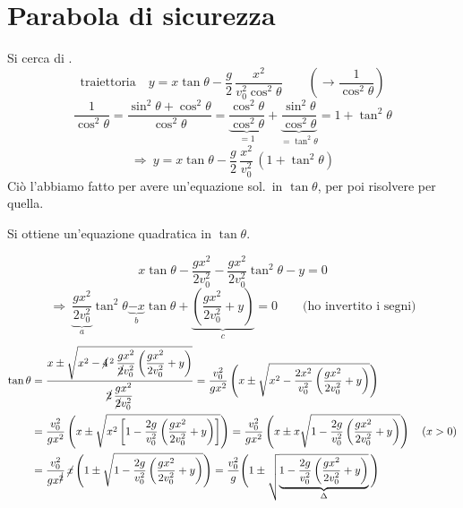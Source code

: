 \documentclass[11pt,a4paper,openany]{report}
\begin{document}
\section{Parabola di sicurezza}

Si cerca di .
\[
  \text{traiettoria}\quad y = x\tan\theta - \frac{g}{2}\,\frac{x^2}{v_0^2\cos^2\theta}
  \qquad \left(\to \frac{1}{\cos^2\theta}\right)
\]
\[
  \frac{1}{\cos^2\theta} = \frac{\sin^2\theta + \cos^2\theta}{\cos^2\theta}
  = \underbrace{\frac{\cos^2\theta}{\cos^2\theta}}_{= 1} + \underbrace{\frac{\sin^2\theta}{\cos^2\theta}}_{= \tan^2\theta}
  = 1 + \tan^2\theta
\]
\[
  \Rightarrow\ y = x\tan\theta - \frac{g}{2}\,\frac{x^2}{v_0^2}\,(1 + \tan^2\theta)
\]
Ciò l'abbiamo fatto per avere un'equazione sol.\ in $\tan\theta$, per poi risolvere per quella.

\begin{delucidazione}
Si ottiene un'equazione quadratica in $\tan\theta$.
\end{delucidazione}

\[
  x\tan\theta - \frac{gx^2}{2v_0^2} - \frac{gx^2}{2v_0^2}\tan^2\theta - y = 0
\]
\[
  \Rightarrow\ \underbrace{\frac{gx^2}{2v_0^2}}_{a}\tan^2\theta \underbrace{- x}_{b}\tan\theta
  + \underbrace{\left(\frac{gx^2}{2v_0^2} + y\right)}_{c} = 0
  \qquad \text{(ho invertito i segni)}
\]
\begin{align*}
  \tan\theta
  &= \frac{x \pm \sqrt{x^2 - \cancel{4}^{\,2}\,\dfrac{gx^2}{\cancel{2}v_0^2}\left(\dfrac{gx^2}{2v_0^2} + y\right)}}{\cancel{2}\,\dfrac{gx^2}{\cancel{2}v_0^2}}
   = \frac{v_0^2}{gx^2}\left(x \pm \sqrt{x^2 - \frac{2x^2}{v_0^2}\left(\frac{gx^2}{2v_0^2} + y\right)}\right) \\
  &= \frac{v_0^2}{gx^2}\left(x \pm \sqrt{x^2\left[1 - \frac{2g}{v_0^2}\left(\frac{gx^2}{2v_0^2} + y\right)\right]}\right)
   = \frac{v_0^2}{gx^2}\left(x \pm x\sqrt{1 - \frac{2g}{v_0^2}\left(\frac{gx^2}{2v_0^2} + y\right)}\right)
   \quad (x > 0) \\
  &= \frac{v_0^2}{gx^{\cancel{2}}}\,\cancel{x}\left(1 \pm \sqrt{1 - \frac{2g}{v_0^2}\left(\frac{gx^2}{2v_0^2} + y\right)}\right)
   = \frac{v_0^2}{g}\Bigg(1 \pm \sqrt{\underbrace{1 - \frac{2g}{v_0^2}\left(\frac{gx^2}{2v_0^2} + y\right)}_{\Delta}}\,\Bigg)
\end{align*}
\end{document}
